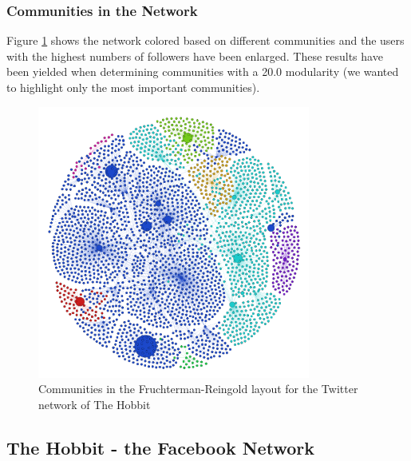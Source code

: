 \documentclass{llncs}
\begin{document}
\subsubsection{Communities in the Network}
Figure \ref{fig:hobbit-twitter-communities} shows the network colored based on
different communities and the users with the highest numbers of followers have
been enlarged. These results have been yielded when determining communities with
a 20.0 modularity (we wanted to highlight only the most important communities).
%
\begin{figure}
\centering
\includegraphics[width=0.8\textwidth]{hobbit-twitter-communities.png}
\caption{Communities in the Fruchterman-Reingold layout for the Twitter network
    of The Hobbit
\label{fig:hobbit-twitter-communities}}
\end{figure}
%
\subsection{The Hobbit - the Facebook Network}
\end{document}
